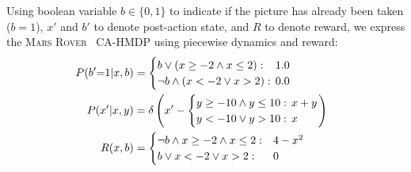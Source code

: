\documentclass[twoside,11pt]{article}
\newcommand{\MarsRover}{\textsc{Mars Rover }}
\newcommand{\sq}{\hspace{-1mm}}
\newcommand{\sqm}{\hspace{-2mm}}
\begin{document}
Using boolean variable $b \in \{0,1\}$ to indicate if the picture has
already been taken ($b=1$), $x'$ and $b'$ to denote 
post-action state, and $R$ to denote reward, we 
express the \MarsRover\ CA-HMDP using piecewise dynamics and reward:
\begin{align*} 
\hspace{-2.8mm} P(b'\sq=\sq1|x,b) & = 
\begin{cases}
b \lor (x \geq -2 \land x \leq 2): & \sqm 1.0\\
\neg b \land (x < -2 \lor x > 2):  & \sqm 0.0
\end{cases}  \\
\hspace{-2.8mm} P(x'|x,y) & = \delta \left( x' - \begin{cases}
y \geq -10 \land y \leq 10 : & \hspace{-2mm} x + y \\
y < -10 \lor y > 10 : & \hspace{-2mm} x
\end{cases}
\right)  \\
\hspace{-2.8mm} R(x,b) & = \begin{cases}
\neg b \land x \geq -2 \land x \leq 2 : & 4 - x^2 \\
b \lor x < -2 \lor x > 2 : & 0
\end{cases} 
\end{align*}
\end{document}
